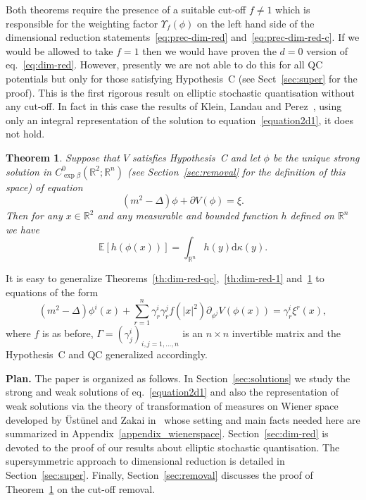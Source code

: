 \documentclass[a4paper,10pt]{article}
\newcommand{\mathd}{\mathrm{d}}
\newcommand{\tmtextbf}[1]{{\bfseries{#1}}}
\newtheorem{theorem}{Theorem}
\begin{document}
Both theorems require the presence of a suitable cut-off $f \neq 1$ which is
responsible for the weighting factor $\Upsilon_f (\phi)$ on the left hand side
of the dimensional reduction statements~{\eqref{eq:prec-dim-red}}
and~{\eqref{eq:prec-dim-red-c}}. If we would be allowed to take $f = 1$ then
we would have proven the $d = 0$ version of eq.~{\eqref{eq:dim-red}}. However,
presently we are not able to do this for all QC potentials but only for those
satisfying Hypothesis~C (see Sect~\ref{sec:super} for the proof). This is the
first rigorous result on elliptic stochastic quantisation without any cut-off.
In fact in this case the results of Klein, Landau and
Perez~{\cite{Klein1984}}, using only an integral representation of the
solution to equation~{\eqref{equation2d1}}, it does not hold.

\begin{theorem}
  \label{theorem_cutoff1}Suppose that $V$ satisfies Hypothesis~C and let
  $\phi$ be the unique strong solution in $C^0_{\exp \beta} (\mathbb{R}^2 ;
  \mathbb{R}^n)$ (see Section~\ref{sec:removal} for the definition of this
  space) of equation
  \begin{equation}
    (m^2 - \Delta) \phi + \partial V (\phi) = \xi . \label{equationcutoff1}
  \end{equation}
  Then for any $x \in \mathbb{R}^2$ and any measurable and bounded function
  $h$ defined on $\mathbb{R}^n$ we have
  \begin{equation}
    \mathbb{E} [h (\phi (x))] = \int_{\mathbb{R}^n} h (y) \mathd \kappa (y) .
    \label{equationcutoff3}
  \end{equation}
\end{theorem}

\begin{remark}
  It is easy to generalize Theorems~\ref{th:dim-red-qc},~\ref{th:dim-red-1}
  and~\ref{theorem_cutoff1} to equations of the form
  \begin{equation}
    (m^2 - \Delta) \phi^i (x) + \sum_{r = 1}^n \gamma_r^i \gamma^j_r f (| x
    |^2) \partial_{\phi^j} V (\phi (x)) = \gamma^i_r \xi^r (x),
    \label{equation2d1-gamma}
  \end{equation}
  where $f$ is as before, $\Gamma = (\gamma^i_j)_{i, j = 1, \ldots, n}$ is an
  $n \times n$ invertible matrix and the Hypothesis~C and QC generalized
  accordingly.
\end{remark}

{\noindent}\tmtextbf{Plan.} The paper is organized as follows. In
Section~\ref{sec:solutions} we study the strong and weak solutions of
eq.~{\eqref{equation2d1}} and also the representation of weak solutions via
the theory of transformation of measures on Wiener space developed by
{\"U}st{\"u}nel and Zakai in~{\cite{Ustunel2000}} whose setting and main facts
needed here are summarized in Appendix~\ref{appendix_wienerspace}.
Section~\ref{sec:dim-red} is devoted to the proof of our results about
elliptic stochastic quantisation. The supersymmetric approach to dimensional
reduction is detailed in Section~\ref{sec:super}. Finally,
Section~\ref{sec:removal} discusses the proof of Theorem~\ref{theorem_cutoff1}
on the cut-off removal.
\end{document}
